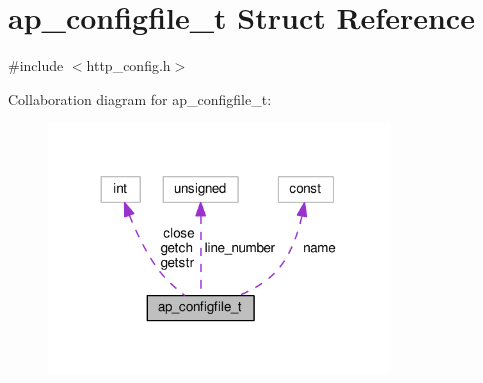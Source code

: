 \hypertarget{structap__configfile__t}{}\section{ap\+\_\+configfile\+\_\+t Struct Reference}
\label{structap__configfile__t}


{\ttfamily \#include $<$http\+\_\+config.\+h$>$}



Collaboration diagram for ap\+\_\+configfile\+\_\+t\+:
\nopagebreak
\begin{figure}[H]
\begin{center}
\leavevmode
\includegraphics[width=257pt]{structap__configfile__t__coll__graph}
\end{center}
\end{figure}
